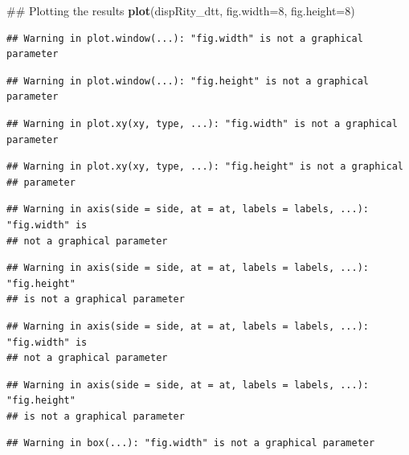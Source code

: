 \documentclass[]{book}
\newenvironment{Shaded}{\begin{snugshade}}{\end{snugshade}}
\newcommand{\KeywordTok}[1]{\textcolor[rgb]{0.13,0.29,0.53}{\textbf{#1}}}
\newcommand{\DataTypeTok}[1]{\textcolor[rgb]{0.13,0.29,0.53}{#1}}
\newcommand{\DecValTok}[1]{\textcolor[rgb]{0.00,0.00,0.81}{#1}}
\newcommand{\NormalTok}[1]{#1}
\theoremstyle{definition}
\theoremstyle{definition}
\theoremstyle{remark}
\begin{document}
\begin{Shaded}
\begin{Highlighting}[]
\NormalTok{## Plotting the results}
\KeywordTok{plot}\NormalTok{(dispRity_dtt, }\DataTypeTok{fig.width=}\DecValTok{8}\NormalTok{, }\DataTypeTok{fig.height=}\DecValTok{8}\NormalTok{)}
\end{Highlighting}
\end{Shaded}

\begin{verbatim}
## Warning in plot.window(...): "fig.width" is not a graphical parameter
\end{verbatim}

\begin{verbatim}
## Warning in plot.window(...): "fig.height" is not a graphical parameter
\end{verbatim}

\begin{verbatim}
## Warning in plot.xy(xy, type, ...): "fig.width" is not a graphical parameter
\end{verbatim}

\begin{verbatim}
## Warning in plot.xy(xy, type, ...): "fig.height" is not a graphical
## parameter
\end{verbatim}

\begin{verbatim}
## Warning in axis(side = side, at = at, labels = labels, ...): "fig.width" is
## not a graphical parameter
\end{verbatim}

\begin{verbatim}
## Warning in axis(side = side, at = at, labels = labels, ...): "fig.height"
## is not a graphical parameter
\end{verbatim}

\begin{verbatim}
## Warning in axis(side = side, at = at, labels = labels, ...): "fig.width" is
## not a graphical parameter
\end{verbatim}

\begin{verbatim}
## Warning in axis(side = side, at = at, labels = labels, ...): "fig.height"
## is not a graphical parameter
\end{verbatim}

\begin{verbatim}
## Warning in box(...): "fig.width" is not a graphical parameter
\end{verbatim}
\end{document}
